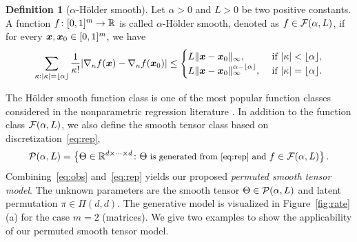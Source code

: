 \documentclass[12pt]{article}
\theoremstyle{definition}
\newtheorem{defn}{Definition}
\begin{document}
\begin{defn}[$\alpha$-H\"older smooth]\label{eq:holder}
Let $\alpha> 0$ and $L>0$ be two positive constants. A function $f\colon [0,1]^m\rightarrow \mathbb{R}$ is called $\alpha$-H\"older smooth, denoted as $f\in\mathcal{F}(\alpha,L)$, if for every $\bm x, \bm x_0\in[0,1]^m$, we have
{\color{blue}\begin{align}\label{eq:defn}
\sum_{\kappa:|\kappa|=\lfloor \alpha \rfloor}{1\over \kappa!}|\nabla_{\kappa} f (\bm x)-\nabla_{\kappa} f(\bm x_0)|\leq
\begin{cases}
L\| \bm x-\bm x_0\|_{\infty},&\text{ if }|\kappa|< \lfloor \alpha\rfloor, \\
L\| \bm x-\bm x_0\|_{\infty}^{\alpha-\lfloor \alpha \rfloor}, &\text{ if }|\kappa|=\lfloor \alpha \rfloor. 
\end{cases}
\end{align}
}
\end{defn}
The H\"older smooth function class is one of the most popular function classes considered in the nonparametric regression literature \citep{klopp2017oracle,gao2015rate}. 
In addition to the function class $\mathcal{F}(\alpha, L)$, we also define the smooth tensor class based on discretization~\eqref{eq:rep}, 
\[
{\small \mathcal{P}(\alpha,L)= \left\{\Theta\in\mathbb{R}^{d\times \cdots \times d} \colon\Theta \text{ is generated from~\eqref{eq:rep} and } f\in\mathcal{F}(\alpha,L)\right\}.}
\]
Combining~\eqref{eq:obs} and~\eqref{eq:rep} yields our proposed \emph{permuted smooth tensor model}. 
The unknown parameters are the smooth tensor $\Theta \in \mathcal{P}(\alpha, L)$ and latent permutation $\pi \in \Pi(d,d)$. The generative model is visualized in Figure~\ref{fig:rate}(a) for the case $m=2$ (matrices). 
We give two examples to show the applicability of our permuted smooth tensor model. 
\end{document}
